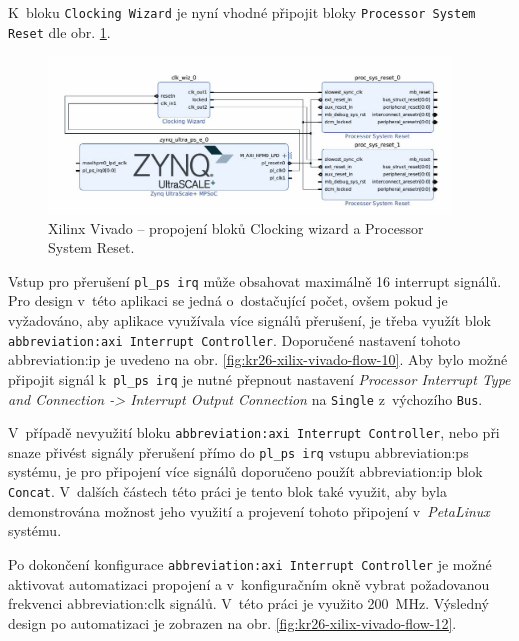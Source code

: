 \documentclass[a4paper, twoside, 11pt]{article}
\begin{document}
				K~bloku \texttt{Clocking Wizard} je nyní vhodné připojit bloky \texttt{Processor System Reset} dle obr. \ref{fig:kr26-xilix-vivado-flow-09}.

				\begin{figure}[htbp!]
					\centering
					\includegraphics[width=0.95\textwidth]{src/png/kr26-xilinx-vivado-flow/kr26-xilix-vivado-flow-09.jpg}
					\caption{Xilinx Vivado – propojení bloků Clocking wizard a Processor System Reset.}
					\label{fig:kr26-xilix-vivado-flow-09}
				\end{figure}
				
				Vstup pro přerušení \texttt{pl\_ps irq} může obsahovat maximálně 16 interrupt signálů. Pro design v~této aplikaci se jedná o~dostačující počet, ovšem pokud je vyžadováno, aby aplikace využívala více signálů přerušení, je třeba využít blok \texttt{\gls{abbreviation:axi} Interrupt Controller}. Doporučené nastavení tohoto \gls{abbreviation:ip} je uvedeno na obr. \ref{fig:kr26-xilix-vivado-flow-10}. Aby bylo možné připojit signál k~\texttt{pl\_ps irq} je nutné přepnout nastavení \textit{Processor Interrupt Type and Connection -> Interrupt Output Connection} na \texttt{Single} z~výchozího \texttt{Bus}.\par
				V~případě nevyužití bloku \texttt{\gls{abbreviation:axi} Interrupt Controller}, nebo při snaze přivést signály přerušení přímo do \texttt{pl\_ps irq} vstupu \gls{abbreviation:ps} systému, je pro připojení více signálů doporučeno použít \gls{abbreviation:ip} blok \texttt{Concat}. V~dalších částech této práci je tento blok také využit, aby byla demonstrována možnost jeho využití a projevení tohoto připojení v~\textit{PetaLinux} systému.\par
				Po dokončení konfigurace \texttt{\gls{abbreviation:axi} Interrupt Controller} je možné aktivovat automatizaci propojení a v~konfiguračním okně vybrat požadovanou frekvenci \gls{abbreviation:clk} signálů. V~této práci je využito 200~MHz. Výsledný design po automatizaci je zobrazen na obr. \ref{fig:kr26-xilix-vivado-flow-12}.\par
\end{document}
